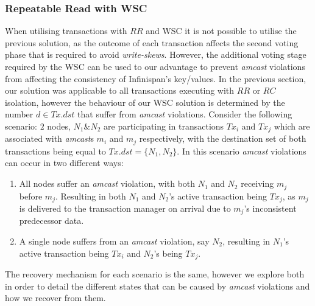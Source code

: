     \subsubsection*{Repeatable Read with WSC}
    When utilising transactions with $RR$ and WSC it is not possible to utilise the previous solution, as the outcome of each transaction affects the second voting phase that is required to avoid \emph{write-skews}.  However, the additional voting stage required by the WSC can be used to our advantage to prevent \emph{amcast} violations from affecting the consistency of Infinispan's key/values.  In the previous section, our solution was applicable to all transactions executing with $RR$ or $RC$ isolation, however the behaviour of our WSC solution is determined by the number $d \in Tx.dst$ that suffer from \emph{amcast} violations. Consider the following scenario: $2$ nodes, $N_1 \& N_2$ are participating in transactions $Tx_i$ and $Tx_j$ which are associated with \emph{amcast}s $m_i$ and $m_j$ respectively, with the destination set of both transactions being equal to $Tx.dst = \{N_1, N_2\}$.  In this scenario \emph{amcast} violations can occur in two different ways:    
    
    \begin{enumerate}
        \item All nodes suffer an \emph{amcast} violation, with both $N_1$ and $N_2$ receiving $m_j$ before $m_j$.  Resulting in both $N_1$ and $N_2$'s active transaction being $Tx_j$, as $m_j$ is delivered to the transaction manager on arrival due to $m_j$'s inconsistent predecessor data.  

        \item A single node suffers from an \emph{amcast} violation, say $N_2$, resulting in $N_1$'s active transaction being $Tx_i$ and $N_2$'s being $Tx_j$.  
    \end{enumerate}
    
    The recovery mechanism for each scenario is the same, however we explore both in order to detail the different states that can be caused by \emph{amcast} violations and how we recover from them.  
    
